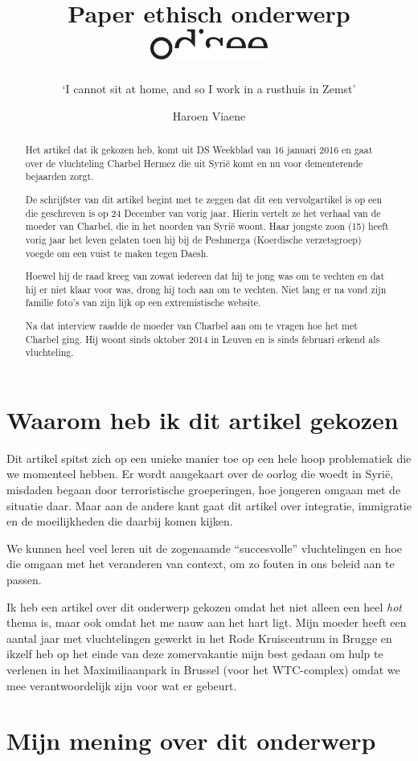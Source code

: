 \documentclass[12pt, a4paper]{paper}
\title{
\vspace{-2cm}
Paper ethisch onderwerp\\
\vspace{-1cm}
\hfill\includegraphics[height=1cm]{logo.pdf}}
\subtitle{`I cannot sit at home, and so I work in a rusthuis in Zemst'
\vspace{-.5cm}}
\author{
\vspace{-1cm}
\begin{large}
  Haroen Viaene
\end{large}
\vspace{-1cm}
}
\begin{document}
\maketitle

\begin{abstract}

Het artikel dat ik gekozen heb, komt uit DS Weekblad van 16 januari 2016 en gaat over de vluchteling Charbel Hermez die uit Syrië komt en nu voor dementerende bejaarden zorgt.

De schrijfster van dit artikel begint met te zeggen dat dit een vervolgartikel is op een die geschreven is op 24 December van vorig jaar. Hierin vertelt ze het verhaal van de moeder van Charbel, die in het noorden van Syrië woont. Haar jongste zoon (15) heeft vorig jaar het leven gelaten toen hij bij de Peshmerga (Koerdische verzetsgroep) voegde om een vuist te maken tegen Daesh.

Hoewel hij de raad kreeg van zowat iedereen dat hij te jong was om te vechten en dat hij er niet klaar voor was, drong hij toch aan om te vechten. Niet lang er na vond zijn familie foto's van zijn lijk op een extremistische website.

Na dat interview raadde de moeder van Charbel aan om te vragen hoe het met Charbel ging. Hij woont sinds oktober 2014 in Leuven en is sinds februari erkend als vluchteling.


\end{abstract}

\section{Waarom heb ik dit artikel gekozen}

Dit artikel spitst zich op een unieke manier toe op een hele hoop problematiek die we momenteel hebben. Er wordt aangekaart over de oorlog die woedt in Syrië, misdaden begaan door terroristische groeperingen, hoe jongeren omgaan met de situatie daar. Maar aan de andere kant gaat dit artikel over integratie, immigratie en de moeilijkheden die daarbij komen kijken.

We kunnen heel veel leren uit de zogenaamde ``succesvolle'' vluchtelingen en hoe die omgaan met het veranderen van context, om zo fouten in ons beleid aan te passen.

Ik heb een artikel over dit onderwerp gekozen omdat het niet alleen een heel \emph{hot} thema is, maar ook omdat het me nauw aan het hart ligt. Mijn moeder heeft een aantal jaar met vluchtelingen gewerkt in het Rode Kruiscentrum in Brugge en ikzelf heb op het einde van deze zomervakantie mijn best gedaan om hulp te verlenen in het Maximiliaanpark in Brussel (voor het WTC-complex) omdat we mee verantwoordelijk zijn voor wat er gebeurt.


\section{Mijn mening over dit onderwerp}



\end{document}
